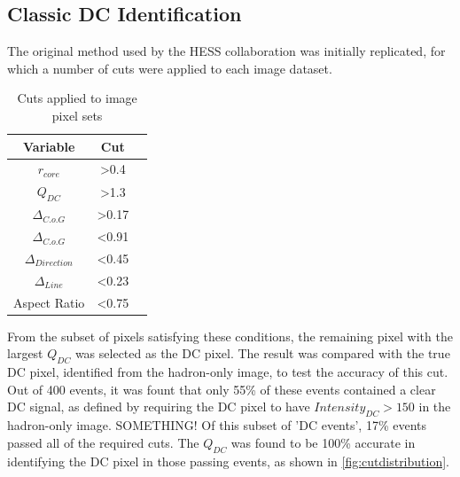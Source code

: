 \documentclass{article}
\begin{document}
\subsection{Classic DC Identification}
The original method used by the HESS collaboration \cite{hess07} was initially replicated, for which a number of cuts were applied to each image dataset.

\begin{table}[h!]
  \centering
  \caption{Cuts applied to image pixel sets}
  \label{tab:qdccuts}
  \begin{tabular}{ccc}
    \toprule
    Variable & Cut\\
    \midrule
     $r_{core}$ & \textgreater 0.4 \\
     $Q_{DC}$ & \textgreater 1.3 \\
     $ \Delta_{C.o.G}$ & \textgreater 0.17 \\
     $ \Delta_{C.o.G}$ & \textless 0.91 \\
     $\Delta_{Direction}$ & \textless 0.45 \\
     $\Delta_{Line}$ & \textless 0.23 \\
     Aspect Ratio & \textless 0.75 \\
    \bottomrule
  \end{tabular}
\end{table}

From the subset of pixels satisfying these conditions, the remaining pixel with the largest $Q_{DC}$ was selected as the DC pixel. The result was compared with the true DC pixel, identified from the hadron-only image, to test the accuracy of this cut. Out of 400 events, it was fount that only 55\% of these events contained a clear DC signal, as defined by requiring the DC pixel to have $Intensity_{DC} > 150$ in the hadron-only image. SOMETHING! Of this subset of 'DC events', 17\% events passed all of the required cuts. The $Q_{DC}$ was found to be 100\% accurate in identifying the DC pixel in those passing events, as shown in \ref{fig:cutdistribution}.
\end{document}
